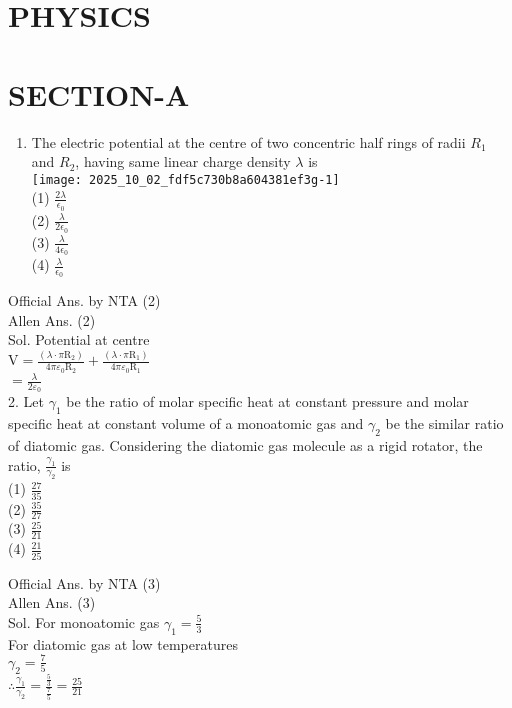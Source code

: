 \documentclass[10pt]{article}
\begin{document}
\section*{PHYSICS}
\section*{SECTION-A}
\begin{enumerate}
  \item The electric potential at the centre of two concentric half rings of radii \(R_{1}\) and \(R_{2}\), having same linear charge density \(\lambda\) is\\
\texttt{[image: 2025\_10\_02\_fdf5c730b8a604381ef3g-1]}\\
(1) \(\frac{2 \lambda}{\epsilon_{0}}\)\\
(2) \(\frac{\lambda}{2 \epsilon_{0}}\)\\
(3) \(\frac{\lambda}{4 \epsilon_{0}}\)\\
(4) \(\frac{\lambda}{\epsilon_{0}}\)
\end{enumerate}

Official Ans. by NTA (2)\\
Allen Ans. (2)\\
Sol. Potential at centre\\
\(\mathrm{V}=\frac{\left(\lambda \cdot \pi \mathrm{R}_{2}\right)}{4 \pi \varepsilon_{0} \mathrm{R}_{2}}+\frac{\left(\lambda \cdot \pi \mathrm{R}_{1}\right)}{4 \pi \varepsilon_{0} \mathrm{R}_{1}}\)\\
\(=\frac{\lambda}{2 \varepsilon_{0}}\)\\
2. Let \(\gamma_{1}\) be the ratio of molar specific heat at constant pressure and molar specific heat at constant volume of a monoatomic gas and \(\gamma_{2}\) be the similar ratio of diatomic gas. Considering the diatomic gas molecule as a rigid rotator, the ratio, \(\frac{\gamma_{1}}{\gamma_{2}}\) is\\
(1) \(\frac{27}{35}\)\\
(2) \(\frac{35}{27}\)\\
(3) \(\frac{25}{21}\)\\
(4) \(\frac{21}{25}\)

Official Ans. by NTA (3)\\
Allen Ans. (3)\\
Sol. For monoatomic gas \(\gamma_{1}=\frac{5}{3}\)\\
For diatomic gas at low temperatures\\
\(\gamma_{2}=\frac{7}{5}\)\\
\(\therefore \frac{\gamma_{1}}{\gamma_{2}}=\frac{\frac{5}{3}}{\frac{7}{5}}=\frac{25}{21}\)
\end{document}
